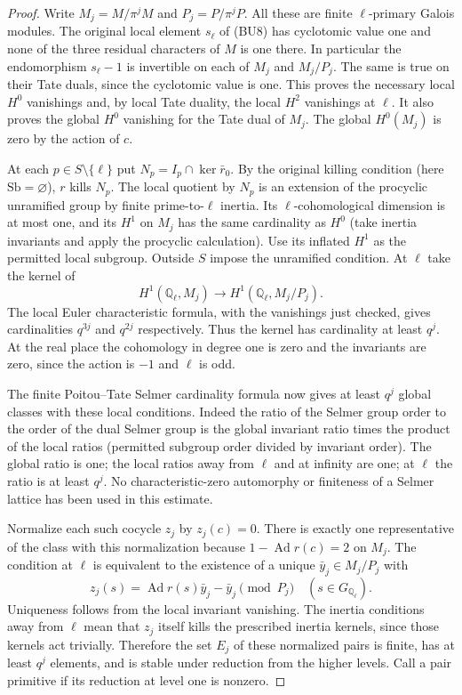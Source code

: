 \begin{proof}
Write $M_j=M/\pi^jM$ and $P_j=P/\pi^jP$. All
these are finite $\ell$-primary Galois modules.
The original local element $s_\ell$ of (BU8) has
cyclotomic value one and none of the three residual
characters of $M$ is one there. In particular
the endomorphism $s_\ell-1$ is invertible on each
of $M_j$ and $M_j/P_j$. The same is true on their
Tate duals, since the cyclotomic value is one.
This proves the necessary local $H^0$ vanishings
and, by local Tate duality, the local $H^2$
vanishings at $\ell$. It also proves the global
$H^0$ vanishing for the Tate dual of $M_j$.
The global $H^0(M_j)$ is zero by the action of $c$.

At each $p\in S\setminus\{\ell\}$ put
$N_p=I_p\cap\ker\bar r_0$. By the original killing
condition (here $\mathrm{Sb}=\varnothing$), $r$ kills
$N_p$. The local quotient by $N_p$ is an extension
of the procyclic unramified group by finite
prime-to-$\ell$ inertia. Its $\ell$-cohomological
dimension is at most one, and its $H^1$ on $M_j$
has the same cardinality as $H^0$ (take inertia
invariants and apply the procyclic calculation).
Use its inflated $H^1$ as the permitted local
subgroup. Outside $S$ impose the unramified
condition. At $\ell$ take the kernel of
\[
 H^1(\mathbb Q_\ell,M_j)\longrightarrow
 H^1(\mathbb Q_\ell,M_j/P_j).
\]
The local Euler characteristic formula, with the
vanishings just checked, gives cardinalities $q^{3j}$
and $q^{2j}$ respectively. Thus the kernel has
cardinality at least $q^j$. At the real place the
cohomology in degree one is zero and the invariants
are zero, since the action is $-1$ and $\ell$ is odd.

The finite Poitou--Tate Selmer cardinality formula
now gives at least $q^j$ global classes with these
local conditions. Indeed the ratio of the Selmer
group order to the order of the dual Selmer group
is the global invariant ratio times the product
of the local ratios (permitted subgroup order
divided by invariant order). The global ratio
is one; the local ratios away from $\ell$ and
at infinity are one; at $\ell$ the ratio is at
least $q^j$. No characteristic-zero
automorphy or finiteness of a Selmer lattice has
been used in this estimate.

Normalize each such cocycle $z_j$ by $z_j(c)=0$.
There is exactly one representative of the class
with this normalization because $1-\operatorname{Ad}r(c)=2$
on $M_j$. The condition at $\ell$ is equivalent
to the existence of a unique $\bar y_j\in M_j/P_j$
with
\[
 z_j(s)=\operatorname{Ad}r(s)\bar y_j-\bar y_j
                       \pmod {P_j}\quad(s\in G_{\mathbb Q_\ell}).
\]
Uniqueness follows from the local invariant vanishing.
The inertia conditions away from $\ell$ mean that
$z_j$ itself kills the prescribed inertia kernels,
since those kernels act trivially. Therefore the
set $E_j$ of these normalized pairs is finite,
has at least $q^j$ elements, and is stable under
reduction from the higher levels. Call a pair
primitive if its reduction at level one is nonzero.


\end{proof}
